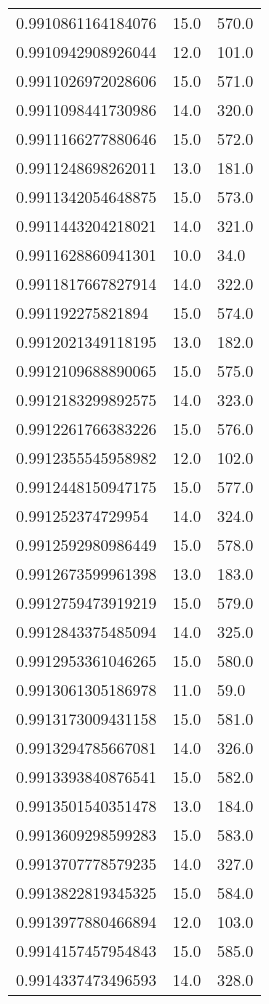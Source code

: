 \begin{center}
\begin{supertabular}[H]{p{0.30\textwidth}p{0.05\textwidth}p{0.05\textwidth}}
0.9910861164184076 & 15.0 & 570.0 \\ 
0.9910942908926044 & 12.0 & 101.0 \\ 
0.9911026972028606 & 15.0 & 571.0 \\ 
0.9911098441730986 & 14.0 & 320.0 \\ 
0.9911166277880646 & 15.0 & 572.0 \\ 
0.9911248698262011 & 13.0 & 181.0 \\ 
0.9911342054648875 & 15.0 & 573.0 \\ 
0.9911443204218021 & 14.0 & 321.0 \\ 
0.9911628860941301 & 10.0 & 34.0 \\ 
0.9911817667827914 & 14.0 & 322.0 \\ 
0.991192275821894 & 15.0 & 574.0 \\ 
0.9912021349118195 & 13.0 & 182.0 \\ 
0.9912109688890065 & 15.0 & 575.0 \\ 
0.9912183299892575 & 14.0 & 323.0 \\ 
0.9912261766383226 & 15.0 & 576.0 \\ 
0.9912355545958982 & 12.0 & 102.0 \\ 
0.9912448150947175 & 15.0 & 577.0 \\ 
0.991252374729954 & 14.0 & 324.0 \\ 
0.9912592980986449 & 15.0 & 578.0 \\ 
0.9912673599961398 & 13.0 & 183.0 \\ 
0.9912759473919219 & 15.0 & 579.0 \\ 
0.9912843375485094 & 14.0 & 325.0 \\ 
0.9912953361046265 & 15.0 & 580.0 \\ 
0.9913061305186978 & 11.0 & 59.0 \\ 
0.9913173009431158 & 15.0 & 581.0 \\ 
0.9913294785667081 & 14.0 & 326.0 \\ 
0.9913393840876541 & 15.0 & 582.0 \\ 
0.9913501540351478 & 13.0 & 184.0 \\ 
0.9913609298599283 & 15.0 & 583.0 \\ 
0.9913707778579235 & 14.0 & 327.0 \\ 
0.9913822819345325 & 15.0 & 584.0 \\ 
0.9913977880466894 & 12.0 & 103.0 \\ 
0.9914157457954843 & 15.0 & 585.0 \\ 
0.9914337473496593 & 14.0 & 328.0 \\ 

\end{supertabular}
\end{center}
